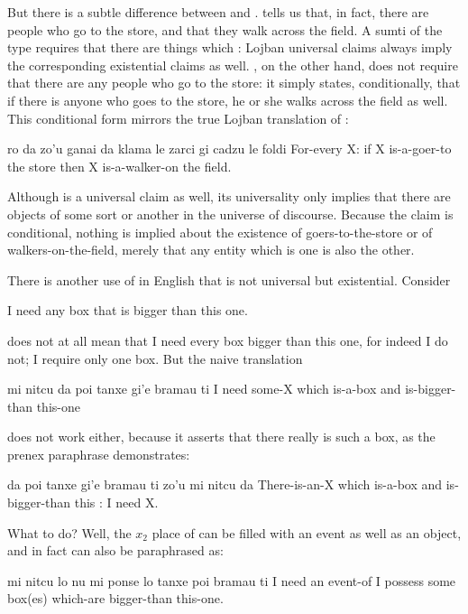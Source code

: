 But there is a subtle difference between  and .  tells us that, in
    fact, there are people who go to the store, and that they walk
    across the field. A sumti of the type 
    requires that there are things which : Lojban
    universal claims always imply the corresponding existential
    claims as well. , on the other
    hand, does not require that there are any people who go to the
    store: it simply states, conditionally, that if there is anyone
    who goes to the store, he or she walks across the field as
    well. This conditional form mirrors the true Lojban translation
    of :
\begin{example}
ro da zo'u ganai da klama le zarci\n
\T	gi cadzu le foldi\n
For-every X: if X is-a-goer-to the store\n
\T	then X is-a-walker-on the field.
\end{example}

Although  is a universal claim
    as well, its universality only implies that there are objects
    of some sort or another in the universe of discourse. Because
    the claim is conditional, nothing is implied about the
    existence of goers-to-the-store or of walkers-on-the-field,
    merely that any entity which is one is also the other. 

There is another use of  in English that is not
    universal but existential. Consider
\begin{example}
I need any box that is bigger than this one.
\end{example}

 does not at all mean that I
    need every box bigger than this one, for indeed I do not; I
    require only one box. But the naive translation
\begin{example}
mi nitcu da poi tanxe\n
\T	gi'e bramau ti\n
I need some-X which is-a-box\n
\T	and is-bigger-than this-one
\end{example}

{\noindent}does not work either, because it asserts that there really is
    such a box, as the prenex paraphrase demonstrates:
\begin{example}
da poi tanxe\n
\T	gi'e bramau ti zo'u mi nitcu da\n
There-is-an-X which is-a-box\n
\T	and is-bigger-than this : I need X.
\end{example}

What to do? Well, the $x_2$ place of  can be filled
    with an event as well as an object, and in fact  can also be paraphrased as:
\begin{example}
mi nitcu lo nu mi ponse\n
\T	lo tanxe poi bramau ti\n
I need an event-of I possess\n
\T	some box(es) which-are bigger-than this-one.
\end{example}

